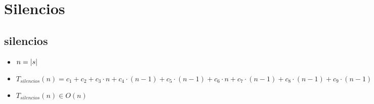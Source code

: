 \documentclass{article}
\begin{document}
    \section*{Silencios}

    \subsection*{silencios}

    \begin{minipage}{0.70\textwidth}
        
    \end{minipage}
    \hfill
    \begin{minipage}{0.25\textwidth}
    \end{minipage}

    \begin{itemize}
        \item $n = |s|$
        \item $T_{silencios}(n) = c_1 +
                                  c_2 +
                                  c_3 \cdot n +
                                  c_4 \cdot (n-1) +
                                  c_5 \cdot (n-1) +
                                  c_6 \cdot n +
                                  c_7 \cdot (n-1) +
                                  c_8 \cdot (n-1) +
                                  c_9 \cdot (n-1)$
        \item $T_{silencios}(n) \in O(n)$
    \end{itemize}
\end{document}
